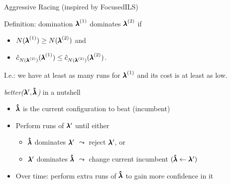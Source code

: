 \begin{frame}[c,fragile]{Aggressive Racing (inspired by FocusedILS) }


\begin{block}{Definition: domination}
\alert{${\pmb{\lambda}}^{(1)}$ dominates ${\pmb{\lambda}}^{(2)}$} if 
\begin{itemize}
\item $N({\pmb{\lambda}}^{(1)}) \ge N({\pmb{\lambda}}^{(2)})$ and 
\item $\hat{c}_{N({\pmb{\lambda}}^{(2)})}({\pmb{\lambda}}^{(1)}) \le \hat{c}_{N({\pmb{\lambda}}^{(2)})}({\pmb{\lambda}}^{(2)})$.
\end{itemize}
I.e.: we have at least as many runs for ${\pmb{\lambda}}^{(1)}$ and its cost is at least as low.
\end{block}

\pause

\begin{block}{\textit{better($\pmb{\lambda}', \pmb{\hat{\lambda}}$)} in a nutshell}
\begin{itemize}
\item $\pmb{\hat{\lambda}}$ is the current configuration to beat (incumbent)
\pause
\item Perform runs of $\pmb{\lambda}'$ until either
\begin{itemize}
\item $\pmb{\hat{\lambda}}$ dominates $\pmb{\lambda}'$ $\leadsto$ reject $\pmb{\lambda}'$, or
\item $\pmb{\lambda}'$ dominates $\pmb{\hat{\lambda}}$ $\leadsto$ change current incumbent $(\pmb{\hat{\lambda}} \leftarrow \pmb{\lambda}')$
\end{itemize}
\pause	
\item Over time: perform extra runs of $\pmb{\hat{\lambda}}$ to gain more confidence in it
\end{itemize}
\end{block}

\end{frame}




